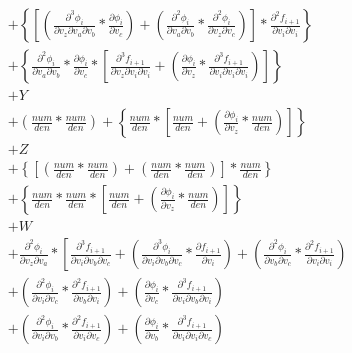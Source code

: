 \documentclass[12pt,letter]{article}
\begin{document}
\begin{equation}
\begin{split}
	\\
	&+
	\left\{\left[\left(\frac{\partial^3 \phi_i}{\partial v_z \partial v_a \partial v_b} * \frac{\partial \phi_i}{\partial v_c}\right) + \left(\frac{\partial^2 \phi_i}{\partial v_a \partial v_b} * \frac{\partial^2 \phi_i}{\partial v_z \partial v_c}\right)\right] * \frac{\partial^2 f_{i+1}}{\partial v_i \partial v_i}\right\}
	\\
	&+
	\left\{\frac{\partial^2 \phi_i}{\partial v_a \partial v_b} * \frac{\partial \phi_i}{\partial v_c} * \left[\frac{\partial^3 f_{i+1}}{\partial v_z \partial v_i \partial v_i} + \left(\frac{\partial \phi_i}{\partial v_z} * \frac{\partial^3 f_{i+1}}{\partial v_i \partial v_i \partial v_i}\right)\right]\right\}
	\\
	&+
	Y
	\\
	&+
	\left(\frac{num}{den} * \frac{num}{den}\right) +
	\left\{\frac{num}{den} * \left[\frac{num}{den} + \left(\frac{\partial \phi_i}{\partial v_z} * \frac{num}{den}\right)\right]\right\}
	\\
	&+
	Z
	\\
	&+
	\left\{\left[\left(\frac{num}{den} * \frac{num}{den}\right) + \left(\frac{num}{den} * \frac{num}{den}\right)\right] * \frac{num}{den}\right\}
	\\
	&+
	\left\{\frac{num}{den} * \frac{num}{den} * \left[\frac{num}{den} + \left(\frac{\partial \phi_i}{\partial v_z} * \frac{num}{den}\right)\right]\right\}
	\\
	&+
	W
	\\
	&+
	\frac{\partial^2 \phi_i}{\partial v_z \partial v_a} * 
	\left[\frac{\partial^3 f_{i+1}}{\partial v_i \partial v_b \partial v_c} + 
	\left(\frac{\partial^3 \phi_i}{\partial v_i \partial v_b \partial v_c} * \frac{\partial f_{i+1}}{\partial v_i}\right) + 
	\left(\frac{\partial^2 \phi_i}{\partial v_b \partial v_c} * \frac{\partial^2 f_{i+1}}{\partial v_i \partial v_i}\right) 
	\right.
	\\
	&
	\left.
	+ \left(\frac{\partial^2 \phi_i}{\partial v_i \partial v_c} * \frac{\partial^2 f_{i+1}}{\partial v_b \partial v_i}\right) + 
	\left(\frac{\partial \phi_i}{\partial v_c} * \frac{\partial^3 f_{i+1}}{\partial v_i \partial v_b \partial v_i}\right) 
	\right.
	\\
	&
	\left.
	+ \left(\frac{\partial^2 \phi_i}{\partial v_i \partial v_b} * \frac{\partial^2 f_{i+1}}{\partial v_i \partial v_c}\right) + 
	\left(\frac{\partial \phi_i}{\partial v_b} * \frac{\partial^3 f_{i+1}}{\partial v_i \partial v_i \partial v_c}\right) 
	\right.
	\\
	&

\end{split}
\end{equation}
\end{document}

